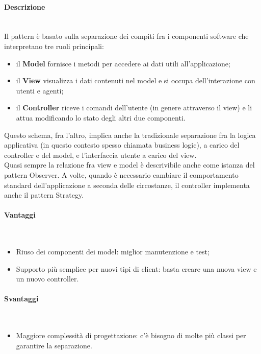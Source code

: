 \paragraph{Descrizione} \mbox{} \\
Il pattern è basato sulla separazione dei compiti fra i componenti software che interpretano tre ruoli principali:
\begin{itemize}
\item il \textbf{Model} fornisce i metodi per accedere ai dati utili all'applicazione;
\item il \textbf{View} visualizza i dati contenuti nel model e si occupa dell'interazione con utenti e agenti;
\item il \textbf{Controller} riceve i comandi dell'utente (in genere attraverso il view) e li attua modificando lo stato degli altri due componenti.
\end{itemize}
Questo schema, fra l'altro, implica anche la tradizionale separazione fra la logica applicativa (in questo contesto spesso chiamata business logic), a carico del controller e del model, e l'interfaccia utente a carico del view. \\
Quasi sempre la relazione fra view e model è descrivibile anche come istanza del pattern Observer. A volte, quando è necessario cambiare il comportamento standard dell'applicazione a seconda delle circostanze, il controller implementa anche il pattern Strategy.
\paragraph{Vantaggi} \mbox{} \\
\begin{itemize}
\item Riuso dei componenti dei model: miglior manutenzione e test;
\item Supporto più semplice per nuovi tipi di client: basta creare una nuova view e un nuovo controller.
\end{itemize}
\paragraph{Svantaggi} \mbox{} \\
\begin{itemize}
\item Maggiore complessità di progettazione: c'è bisogno di molte più classi per garantire la separazione.
\end{itemize}

